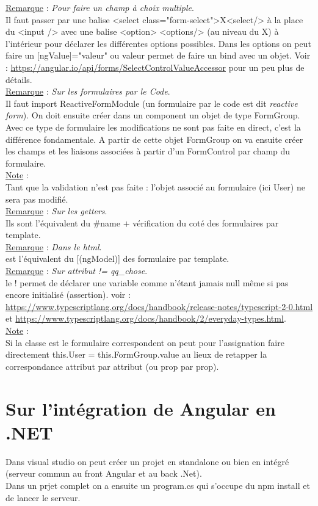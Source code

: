 \documentclass[a4paper,12pt,twoside]{article}
\newcommand{\incode}[1]{{\footnotesize\ttfamily #1}} %
\newcommand{\rem}[2]{\noindent\underline{Remarque} : \textit{#1}.\\ \indent #2}
\newcommand{\note}[1]{\noindent\underline{Note} : \\ \indent #1}
\begin{document}
\rem{Pour faire un champ à choix multiple}{Il faut passer par une balise <select class="form-select">X<select/> à la place du <input /> avec une balise <option> <options/> (au niveau du X) à l'intérieur pour déclarer les différentes options possibles. Dans les options on peut faire un [ngValue]="valeur" ou valeur permet de faire un bind avec un objet. Voir : \url{https://angular.io/api/forms/SelectControlValueAccessor} pour un peu plus de détails.}\\

\rem{Sur les formulaires par le Code}{Il faut import ReactiveFormModule (un formulaire par le code est dit \textit{reactive form}). On doit ensuite créer dans un component un objet de type FormGroup. Avec ce type de formulaire les modifications ne sont pas faite en direct, c'est la différence fondamentale. A partir de cette objet FormGroup on va ensuite créer les champs et les liaisons associées à partir d'un FormControl par champ du formulaire.}\\

\note{Tant que la validation n'est pas faite : l'objet associé au formulaire (ici User) ne sera pas modifié.}\\

\rem{Sur les getters}{Ils sont l'équivalent du \#name $+$ vérification du coté des formulaires par template.}\\

\rem{Dans le html}{[formControlName] est l'équivalent du [(ngModel)] des formulaire par template.}\\

\rem{Sur \incode{attribut != qq_chose}}{le ! permet de déclarer une variable comme n'étant jamais null même si pas encore initialisé (assertion). voir : \url{https://www.typescriptlang.org/docs/handbook/release-notes/typescript-2-0.html} et \url{https://www.typescriptlang.org/docs/handbook/2/everyday-types.html}.}\\

\note{Si la classe est le formulaire correspondent on peut pour l'assignation faire directement this.User = this.FormGroup.value au lieux de retapper la correspondance attribut par attribut (ou prop par prop).}\\

\section{Sur l'intégration de Angular en .NET}

Dans visual studio on peut créer un projet en standalone ou bien en intégré (serveur commun au front Angular et au back .Net).\\
Dans un prjet complet on a ensuite un program.cs qui s'occupe du npm install et de lancer le serveur.\\
\end{document}
